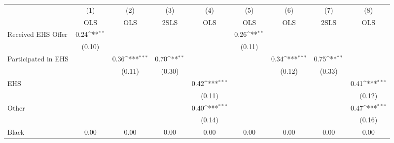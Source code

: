 {
\def\sym#1{\ifmmode^{#1}\else\(^{#1}\)\fi}
\begin{tabular}{l*{8}{c}}
\hline\hline
                    &\multicolumn{1}{c}{(1)}&\multicolumn{1}{c}{(2)}&\multicolumn{1}{c}{(3)}&\multicolumn{1}{c}{(4)}&\multicolumn{1}{c}{(5)}&\multicolumn{1}{c}{(6)}&\multicolumn{1}{c}{(7)}&\multicolumn{1}{c}{(8)}\\
                    &\multicolumn{1}{c}{OLS}&\multicolumn{1}{c}{OLS}&\multicolumn{1}{c}{2SLS}&\multicolumn{1}{c}{OLS}&\multicolumn{1}{c}{OLS}&\multicolumn{1}{c}{OLS}&\multicolumn{1}{c}{2SLS}&\multicolumn{1}{c}{OLS}\\
\hline
Received EHS Offer  &        0.24\sym{**} &                     &                     &                     &        0.26\sym{**} &                     &                     &                     \\
                    &      (0.10)         &                     &                     &                     &      (0.11)         &                     &                     &                     \\
[1em]
Participated in EHS &                     &        0.36\sym{***}&        0.70\sym{**} &                     &                     &        0.34\sym{***}&        0.75\sym{**} &                     \\
                    &                     &      (0.11)         &      (0.30)         &                     &                     &      (0.12)         &      (0.33)         &                     \\
[1em]
EHS                 &                     &                     &                     &        0.42\sym{***}&                     &                     &                     &        0.41\sym{***}\\
                    &                     &                     &                     &      (0.11)         &                     &                     &                     &      (0.12)         \\
[1em]
Other               &                     &                     &                     &        0.40\sym{***}&                     &                     &                     &        0.47\sym{***}\\
                    &                     &                     &                     &      (0.14)         &                     &                     &                     &      (0.16)         \\
[1em]
Black               &        0.00         &        0.00         &        0.00         &        0.00         &        0.00         &        0.00         &        0.00         &        0.00         \\

\end{tabular}}
